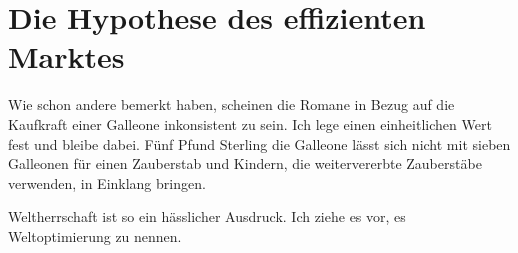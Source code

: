 \chapter{Die Hypothese des effizienten Marktes}

\begin{chapterOpeningAuthorNote}
%
Wie schon andere bemerkt haben, scheinen die Romane in Bezug auf die Kaufkraft einer Galleone inkonsistent zu sein. Ich lege einen einheitlichen Wert fest und bleibe dabei. Fünf Pfund Sterling die Galleone lässt sich nicht mit sieben Galleonen für einen Zauberstab und Kindern, die weitervererbte Zauberstäbe verwenden, in Einklang bringen.
\end{chapterOpeningAuthorNote}
\begin{chapterOpeningQuote}
Weltherrschaft ist so ein hässlicher Ausdruck. Ich ziehe es vor, es Weltoptimierung zu nennen.%
\end{chapterOpeningQuote}


